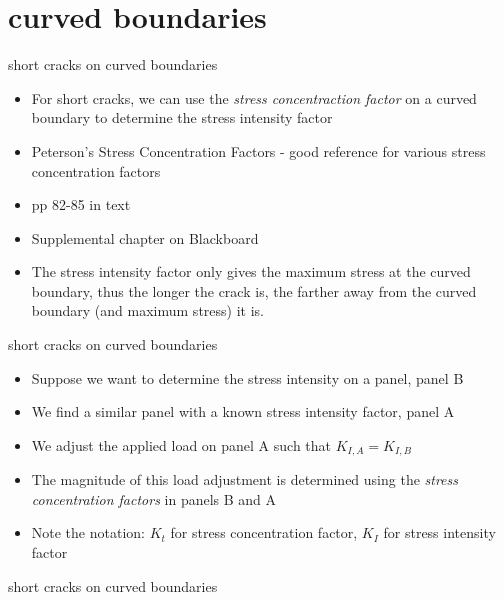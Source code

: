 \documentclass[10pt,handout]{beamer}
\begin{document}
\section{curved boundaries}

\begin{frame}{short cracks on curved boundaries}
	\begin{itemize}
		\item For short cracks, we can use the \emph{stress concentraction factor} on a curved boundary to determine the stress intensity factor
		\item Peterson's Stress Concentration Factors - good reference for various stress concentration factors
		\item pp 82-85 in text
		\item Supplemental chapter on Blackboard
		\item The stress intensity factor only gives the maximum stress at the curved boundary, thus the longer the crack is, the farther away from the curved boundary (and maximum stress) it is.
	\end{itemize}
\end{frame}

\begin{frame}{short cracks on curved boundaries}
	\begin{itemize}
		\item Suppose we want to determine the stress intensity on a panel, panel B
		\item We find a similar panel with a known stress intensity factor, panel A
		\item We adjust the applied load on panel A such that $K_{I,A} = K_{I,B}$
		\item The magnitude of this load adjustment is determined using the \emph{stress concentration factors} in panels B and A
		\item Note the notation: $K_t$ for stress concentration factor, $K_I$ for stress intensity factor
	\end{itemize}
\end{frame}

\begin{frame}{short cracks on curved boundaries}
	\begin{figure}
	\end{figure}
\end{frame}
\end{document}
